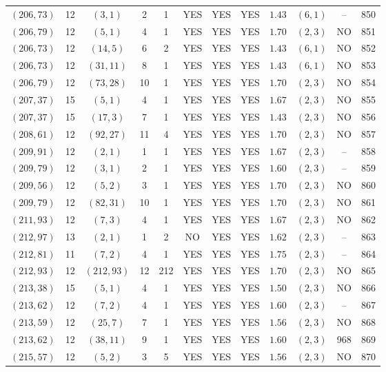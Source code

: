 \begin{longtable}{|c|c|c|c|c|c|c|c|c|c|c|c|}
$(206,73)$ & 12 & $(3,1)$ & 2 & 1 & YES & YES & YES & $1.43$ & $(6,1)$ & -- & 850\\
$(206,79)$ & 12 & $(5,1)$ & 4 & 1 & YES & YES & YES & $1.70$ & $(2,3)$ & NO & 851\\
$(206,73)$ & 12 & $(14,5)$ & 6 & 2 & YES & YES & YES & $1.43$ & $(6,1)$ & NO & 852\\
$(206,73)$ & 12 & $(31,11)$ & 8 & 1 & YES & YES & YES & $1.43$ & $(6,1)$ & NO & 853\\
$(206,79)$ & 12 & $(73,28)$ & 10 & 1 & YES & YES & YES & $1.70$ & $(2,3)$ & NO & 854\\
$(207,37)$ & 15 & $(5,1)$ & 4 & 1 & YES & YES & YES & $1.67$ & $(2,3)$ & NO & 855\\
$(207,37)$ & 15 & $(17,3)$ & 7 & 1 & YES & YES & YES & $1.43$ & $(2,3)$ & NO & 856\\
$(208,61)$ & 12 & $(92,27)$ & 11 & 4 & YES & YES & YES & $1.70$ & $(2,3)$ & NO & 857\\
$(209,91)$ & 12 & $(2,1)$ & 1 & 1 & YES & YES & YES & $1.67$ & $(2,3)$ & -- & 858\\
$(209,79)$ & 12 & $(3,1)$ & 2 & 1 & YES & YES & YES & $1.60$ & $(2,3)$ & -- & 859\\
$(209,56)$ & 12 & $(5,2)$ & 3 & 1 & YES & YES & YES & $1.70$ & $(2,3)$ & NO & 860\\
$(209,79)$ & 12 & $(82,31)$ & 10 & 1 & YES & YES & YES & $1.70$ & $(2,3)$ & NO & 861\\
$(211,93)$ & 12 & $(7,3)$ & 4 & 1 & YES & YES & YES & $1.67$ & $(2,3)$ & NO & 862\\
$(212,97)$ & 13 & $(2,1)$ & 1 & 2 & NO & YES & YES & $1.62$ & $(2,3)$ & -- & 863\\
$(212,81)$ & 11 & $(7,2)$ & 4 & 1 & YES & YES & YES & $1.75$ & $(2,3)$ & -- & 864\\
$(212,93)$ & 12 & $(212,93)$ & 12 & 212 & YES & YES & YES & $1.70$ & $(2,3)$ & NO & 865\\
$(213,38)$ & 15 & $(5,1)$ & 4 & 1 & YES & YES & YES & $1.50$ & $(2,3)$ & NO & 866\\
$(213,62)$ & 12 & $(7,2)$ & 4 & 1 & YES & YES & YES & $1.60$ & $(2,3)$ & -- & 867\\
$(213,59)$ & 12 & $(25,7)$ & 7 & 1 & YES & YES & YES & $1.56$ & $(2,3)$ & NO & 868\\
$(213,62)$ & 12 & $(38,11)$ & 9 & 1 & YES & YES & YES & $1.60$ & $(2,3)$ & 968 & 869\\
$(215,57)$ & 12 & $(5,2)$ & 3 & 5 & YES & YES & YES & $1.56$ & $(2,3)$ & NO & 870\\

\end{longtable}
